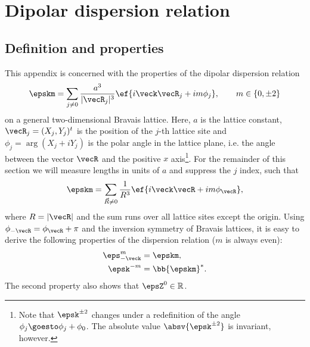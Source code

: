\chapter{Dipolar dispersion relation}
\label{dipolar_dispersion}

\section{Definition and properties}
This appendix is concerned with the properties of the dipolar dispersion relation~\cite{Peter2012b,Syzranov2014,Peter2014}
\begin{align}
    \epskm = \sum_{j\ne 0} \frac{a^3}{|\vecR_j|^3}\ef{i\veck \vecR_j + i m \phi_{j}},\qquad m \in \{0, \pm 2\}
\end{align}
on a general two-dimensional Bravais lattice.
Here, $a$ is the lattice constant, $\vecR_j=(X_j, Y_j)^t$ is the position of the $j$-th lattice site and $\phi_j = \arg(X_j+i Y_j)$ is the polar angle in the lattice plane, i.e. the angle between the vector $\vecR$ and the positive $x$ axis\footnote{Note that $\epsk^{\pm 2}$ changes under a redefinition of the angle $\phi_j \goesto \phi_j + \phi_0$. The absolute value $\absv{\epsk^{\pm 2}}$ is invariant, however.}. For the remainder of this section we will measure lengths in units of $a$ and suppress the $j$ index, such that
\begin{align}
    \epskm = \sum_{\vec{R}\ne0} \frac{1}{R^3}\ef{i\veck \vecR + i m \phi_{\vecR}},
\end{align}
where $R=|\vecR|$ and the sum runs over all lattice sites except the origin.
Using $\phi_{-\vecR} = \phi_\vecR + \pi$ and the inversion symmetry of Bravais lattices,
it is easy to derive the following properties of the dispersion relation ($m$ is always even):
\begin{align}
    \eps_{-\veck}^m &= \epskm, \\
    \epsk^{-m} &= \bb{ \epskm }^*.
\end{align}
The second property also shows that $\epsZ^0 \in \mathbb{R}$.


